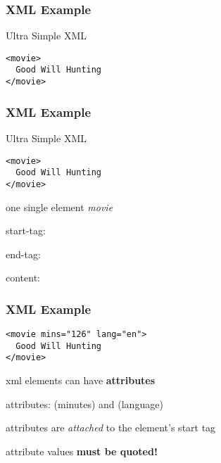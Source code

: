 \documentclass[12pt]{beamer}\usepackage[]{graphicx}\usepackage[]{color}
\begin{document}

\begin{frame}
\frametitle{}
\begin{center}
\end{center}
\end{frame}


\begin{frame}[fragile]
\frametitle{XML Example}

\begin{block}{Ultra Simple XML}
{\Large \begin{verbatim}
<movie>
  Good Will Hunting
</movie>
\end{verbatim}
}
\end{block}

\end{frame}


\begin{frame}[fragile]
\frametitle{XML Example}

\begin{block}{Ultra Simple XML}
\begin{verbatim}
<movie>
  Good Will Hunting
</movie>
\end{verbatim}
\end{block}

\bigskip

\bi
 \item one single element {\textit{movie}}
 \item start-tag: {\hilit {}}
 \item end-tag: {\hilit {}}
 \item content: 
\ei

\end{frame}


\begin{frame}[fragile]
\frametitle{XML Example}

\begin{verbatim}
<movie mins="126" lang="en">
  Good Will Hunting
</movie>
\end{verbatim}
\eb

\bigskip

\bi
 \item xml elements can have \textbf{attributes}
 \item attributes:   (minutes) and  (language)
 \item attributes are \textit{attached} to the element's start tag
 \item attribute values \textbf{must be quoted!}
\ei

\end{frame}
\end{document}
